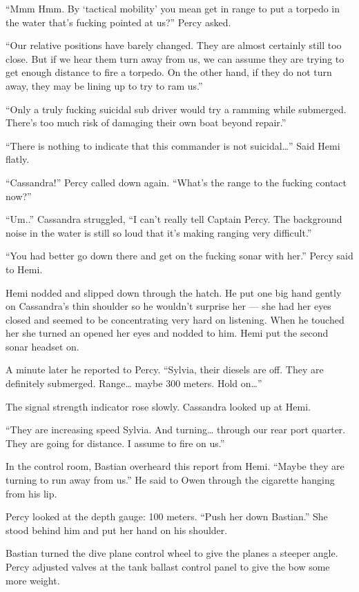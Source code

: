 \documentclass[
]{scrbook}
\begin{document}
``Mmm Hmm. By `tactical mobility' you mean get in range to put a torpedo
in the water that's fucking pointed at us?'' Percy asked.

``Our relative positions have barely changed. They are almost certainly
still too close. But if we hear them turn away from us, we can assume
they are trying to get enough distance to fire a torpedo. On the other
hand, if they do not turn away, they may be lining up to try to ram
us.''

``Only a truly fucking suicidal sub driver would try a ramming while
submerged. There's too much risk of damaging their own boat beyond
repair.''

``There is nothing to indicate that this commander is not
suicidal\ldots{}'' Said Hemi flatly.

``Cassandra!'' Percy called down again. ``What's the range to the
fucking contact now?''

``Um..'' Cassandra struggled, ``I can't really tell Captain Percy. The
background noise in the water is still so loud that it's making ranging
very difficult.''

``You had better go down there and get on the fucking sonar with her.''
Percy said to Hemi.

Hemi nodded and slipped down through the hatch. He put one big hand
gently on Cassandra's thin shoulder so he wouldn't surprise her --- she
had her eyes closed and seemed to be concentrating very hard on
listening. When he touched her she turned an opened her eyes and nodded
to him. Hemi put the second sonar headset on.

A minute later he reported to Percy. ``Sylvia, their diesels are off.
They are definitely submerged. Range\ldots{} maybe 300 meters. Hold
on\ldots{}''

The signal strength indicator rose slowly. Cassandra looked up at Hemi.

``They are increasing speed Sylvia. And turning\ldots{} through our rear
port quarter. They are going for distance. I assume to fire on us.''

In the control room, Bastian overheard this report from Hemi. ``Maybe
they are turning to run away from us.'' He said to Owen through the
cigarette hanging from his lip.

Percy looked at the depth gauge: 100 meters. ``Push her down Bastian.''
She stood behind him and put her hand on his shoulder.

Bastian turned the dive plane control wheel to give the planes a steeper
angle. Percy adjusted valves at the tank ballast control panel to give
the bow some more weight.
\end{document}
